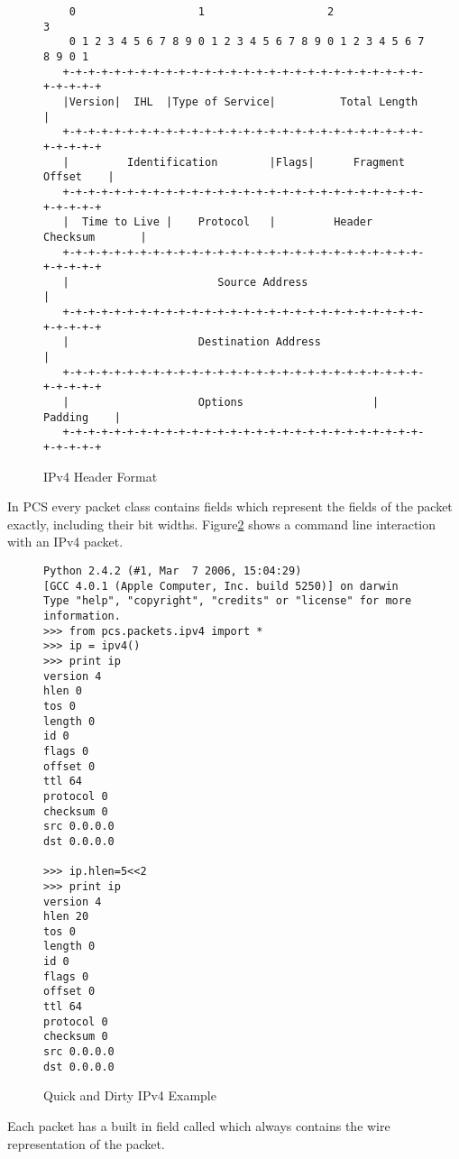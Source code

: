 \documentclass[11pt]{article}
\begin{document}
\begin{figure}
\label{fig:rfc791-ipheader}
  \centering
\begin{verbatim}
    0                   1                   2                   3   
    0 1 2 3 4 5 6 7 8 9 0 1 2 3 4 5 6 7 8 9 0 1 2 3 4 5 6 7 8 9 0 1 
   +-+-+-+-+-+-+-+-+-+-+-+-+-+-+-+-+-+-+-+-+-+-+-+-+-+-+-+-+-+-+-+-+
   |Version|  IHL  |Type of Service|          Total Length         |
   +-+-+-+-+-+-+-+-+-+-+-+-+-+-+-+-+-+-+-+-+-+-+-+-+-+-+-+-+-+-+-+-+
   |         Identification        |Flags|      Fragment Offset    |
   +-+-+-+-+-+-+-+-+-+-+-+-+-+-+-+-+-+-+-+-+-+-+-+-+-+-+-+-+-+-+-+-+
   |  Time to Live |    Protocol   |         Header Checksum       |
   +-+-+-+-+-+-+-+-+-+-+-+-+-+-+-+-+-+-+-+-+-+-+-+-+-+-+-+-+-+-+-+-+
   |                       Source Address                          |
   +-+-+-+-+-+-+-+-+-+-+-+-+-+-+-+-+-+-+-+-+-+-+-+-+-+-+-+-+-+-+-+-+
   |                    Destination Address                        |
   +-+-+-+-+-+-+-+-+-+-+-+-+-+-+-+-+-+-+-+-+-+-+-+-+-+-+-+-+-+-+-+-+
   |                    Options                    |    Padding    |
   +-+-+-+-+-+-+-+-+-+-+-+-+-+-+-+-+-+-+-+-+-+-+-+-+-+-+-+-+-+-+-+-+
\end{verbatim}
  \caption{IPv4 Header Format}
\end{figure}

In PCS every packet class contains fields which represent the fields
of the packet exactly, including their bit widths.
Figure\ref{fig:ipv4-quick-and-dirty} shows a command line interaction
with an IPv4 packet.

\begin{figure}
  \centering
\begin{verbatim}
Python 2.4.2 (#1, Mar  7 2006, 15:04:29) 
[GCC 4.0.1 (Apple Computer, Inc. build 5250)] on darwin
Type "help", "copyright", "credits" or "license" for more information.
>>> from pcs.packets.ipv4 import *
>>> ip = ipv4()
>>> print ip
version 4
hlen 0
tos 0
length 0
id 0
flags 0
offset 0
ttl 64
protocol 0
checksum 0
src 0.0.0.0
dst 0.0.0.0

>>> ip.hlen=5<<2
>>> print ip
version 4
hlen 20
tos 0
length 0
id 0
flags 0
offset 0
ttl 64
protocol 0
checksum 0
src 0.0.0.0
dst 0.0.0.0
\end{verbatim}
  \caption{Quick and Dirty IPv4 Example}
  \label{fig:ipv4-quick-and-dirty}
\end{figure}

Each packet has a built in field called  which always contains
the wire representation of the packet.  
\end{document}
